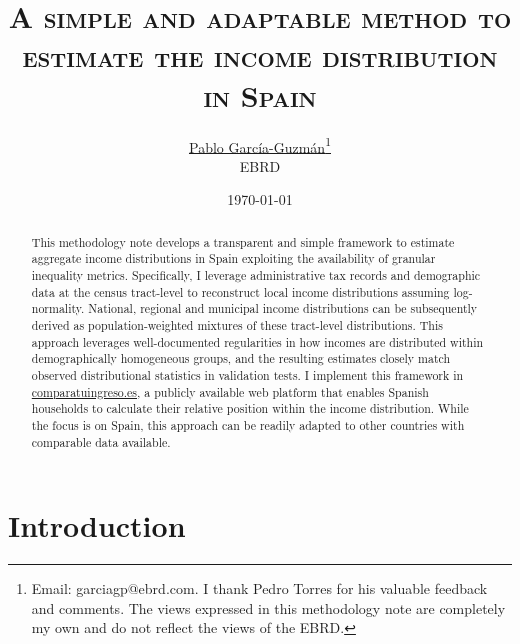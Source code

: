 \documentclass[letterpaper,11pt,leqno]{article}
\begin{document}
\title{\Large \textsc{A simple and adaptable method to estimate the income distribution in Spain}}

\author{\href{https://pablogguz.github.io/}{\large{Pablo García-Guzmán}\thanks{Email: \href{mailto:pablo.garcia-guzman@ebrd.com}{garciagp@ebrd.com}. I thank Pedro Torres for his valuable feedback and comments. The views expressed in this methodology note are completely my own and do not reflect the views of the EBRD.}} \\ \normalsize{EBRD}}

\date{\normalsize \today \\}


\maketitle
\begin{abstract}
\onehalfspacing
This methodology note develops a transparent and simple framework to estimate aggregate income distributions in Spain exploiting the availability of granular inequality metrics. Specifically, I leverage administrative tax records and demographic data at the census tract-level to reconstruct local income distributions assuming log-normality. National, regional and municipal income distributions can be subsequently derived as population-weighted mixtures of these tract-level distributions. This approach leverages well-documented regularities in how incomes are distributed within demographically homogeneous groups, and the resulting estimates closely match observed distributional statistics in validation tests. I implement this framework in \href{https://comparatuingreso.es/}{comparatuingreso.es}, a publicly available web platform that enables Spanish households to calculate their relative position within the income distribution. While the focus is on Spain, this approach can be readily adapted to other countries with comparable data available.
\end{abstract}

\thispagestyle{empty}

\newpage

\setcounter{page}{1}

\section{Introduction}
\end{document}
